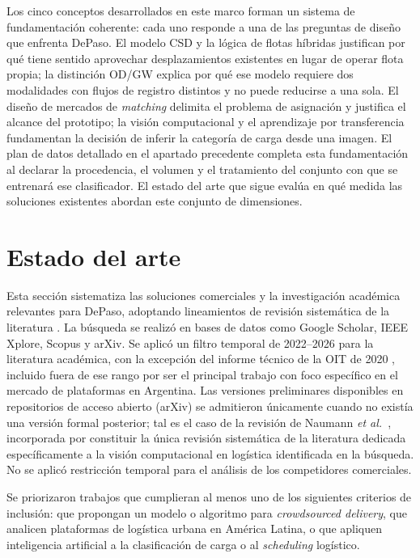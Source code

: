 Los cinco conceptos desarrollados en este marco forman un sistema de fundamentación coherente: cada uno responde a una de las preguntas de diseño que enfrenta DePaso. El modelo CSD y la lógica de flotas híbridas justifican por qué tiene sentido aprovechar desplazamientos existentes en lugar de operar flota propia; la distinción OD/GW explica por qué ese modelo requiere dos modalidades con flujos de registro distintos y no puede reducirse a una sola. El diseño de mercados de \emph{matching} delimita el problema de asignación y justifica el alcance del prototipo; la visión computacional y el aprendizaje por transferencia fundamentan la decisión de inferir la categoría de carga desde una imagen. El plan de datos detallado en el apartado precedente completa esta fundamentación al declarar la procedencia, el volumen y el tratamiento del conjunto con que se entrenará ese clasificador. El estado del arte que sigue evalúa en qué medida las soluciones existentes abordan este conjunto de dimensiones.

\section{Estado del arte}

Esta sección sistematiza las soluciones comerciales y la investigación académica relevantes para DePaso, adoptando lineamientos de revisión sistemática de la literatura \parencite{KitchenhamCharters2007}. La búsqueda se realizó en bases de datos como Google Scholar, IEEE Xplore, Scopus y arXiv. Se aplicó un filtro temporal de 2022--2026 para la literatura académica, con la excepción del informe técnico de la OIT de 2020 \parencite{OIT2020}, incluido fuera de ese rango por ser el principal trabajo con foco específico en el mercado de plataformas en Argentina. Las versiones preliminares disponibles en repositorios de acceso abierto (arXiv) se admitieron únicamente cuando no existía una versión formal posterior; tal es el caso de la revisión de Naumann \textit{et al.}\ \parencite{NaumannEtAl2023}, incorporada por constituir la única revisión sistemática de la literatura dedicada específicamente a la visión computacional en logística identificada en la búsqueda. No se aplicó restricción temporal para el análisis de los competidores comerciales.

Se priorizaron trabajos que cumplieran al menos uno de los siguientes criterios de inclusión: que propongan un modelo o algoritmo para \emph{crowdsourced delivery}, que analicen plataformas de logística urbana en América Latina, o que apliquen inteligencia artificial a la clasificación de carga o al \emph{scheduling} logístico.

